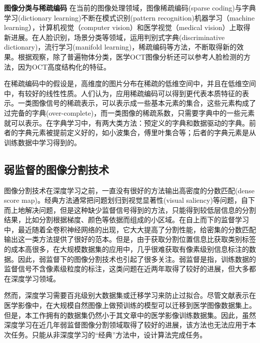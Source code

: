     \textbf{图像分类与稀疏编码}
    在当前的图像处理领域，图像稀疏编码(sparse coding)与字典学习(dictionary learning)不断在模式识别(pattern recognition)机器学习（machine learning），计算机视觉（computer vision）和医学视觉（medical vision）上取得新进展。在人脸识别\cite{zhang2010discriminative,wright2009robust}，场景分类\cite{lazebnik2006beyond,gao2010kernel}等领域，运用判别式字典(discriminative dictionary)，流行学习(manifold learning)，稀疏编码等方法，不断取得新的效果。根据观察，除了普遍物体分类，医学OCT图像分析还可以参考人脸检测的方法，因为OCT高度结构化的特征。

    在稀疏编码中的假设是，高维度的图片分布在稀疏的低维空间中，并且在低维空间中，有较好的线性性质。\cite{huang2006sparse}人们认为，应用稀疏编码可以得到更代表本质特征的表示。一类图像信号的稀疏表示，可以表示成一些基本元素的集合，这些元素构成了过完备的字典(over-complete)，而一类图像的稀疏系数，只需要字典中的一些元素就可以表示。在字典学习中，有两大类方法：预定义的字典和数据驱动的字典。前者的字典元素被提前定义好的，如小波集合，傅里叶集合等；后者的字典元素是从训练数据中学习得到的。



    \subsection{弱监督的图像分割技术}
    图像分割技术在深度学习之前，一直没有很好的方法输出高密度的分数匹配(dense score map)。经典方法通常把问题划归到视觉显著性(visual saliency)\cite{han2006unsupervised,donoser2009saliency,yang2008unsupervised,chang2011co}等问题，自下而上地解决问题，但是这种缺少监督信号得到的方法，只能得到较低层信息的分割结果，比如分割根据梯度、颜色等依据而组成的小区域。在自上而下的监督学习中，最近随着全卷积神经网络\cite{long2015fully}的出现，它大大提高了分割性能，给密集的分数匹配输出这一类方法提供了很好的范本。但是，由于获取分割位置信息比获取类别标签的成本高很多，在大规模数据集的应用中，几乎很难获取有像素级别信息标注的数据。因此，弱监督下的图像分割技术也引起了很多关注。弱监督是指，训练数据的监督信号不含像素级粒度的标注，这类问题在近两年取得了较好的进展，但大多都在深度学习领域\cite{hong2015decoupled,pathak2014fully,oquab2015object,wei2016stc,papandreou2015weakly}。

    然而，深度学习需要百兆级别大数据集\cite{deng2009imagenet}或迁移学习\cite{shin2016deep,wangtransfer}来防止过拟合。尽管文献表示在医学影像中，在大规模自然图像上做预训练的模型可以迁移到医学图像数据集上。但是，本工作拥有的数据集仍然小于其文章中的医学影像训练数据集。因此，虽然深度学习在近几年弱监督图像分割领域取得了较好的进展，该方法也无法应用于本次任务。只能从非深度学习的“经典”方法中，设计算法完成任务。





